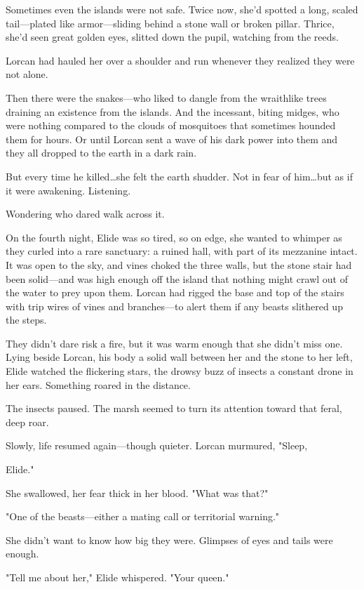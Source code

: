 Sometimes even the islands were not safe.
Twice now, she'd spotted a long, scaled tail---plated like armor---sliding behind a stone wall or broken pillar.
Thrice, she'd seen great golden eyes, slitted down the pupil, watching from the reeds.

Lorcan had hauled her over a shoulder and run whenever they realized they were not alone.

Then there were the snakes---who liked to dangle from the wraithlike trees draining an existence from the islands.
And the incessant, biting midges, who were nothing compared to the clouds of mosquitoes that sometimes hounded them for hours.
Or until Lorcan sent a wave of his dark power into them and they all dropped to the earth in a dark rain.

But every time he killed\ldots she felt the earth shudder.
Not in fear of him\ldots but as if it were awakening.
Listening.

Wondering who dared walk across it.

On the fourth night, Elide was so tired, so on edge, she wanted to whimper as they curled into a rare sanctuary: a ruined hall, with part of its mezzanine intact.
It was open to the sky, and vines choked the three walls, but the stone stair had been solid---and was high enough off the island that nothing might crawl out of the water to prey upon them.
Lorcan had rigged the base and top of the stairs with trip wires of vines and branches---to alert them if any beasts slithered up the steps.

They didn't dare risk a fire, but it was warm enough that she didn't miss one.
Lying beside Lorcan, his body a solid wall between her and the stone to her left, Elide watched the flickering stars, the drowsy buzz of insects a constant drone in her ears.
Something roared in the distance.

The insects paused.
The marsh seemed to turn its attention toward that feral, deep roar.

Slowly, life resumed again---though quieter.
Lorcan murmured, "Sleep,

Elide."

She swallowed, her fear thick in her blood.
"What was that?"

"One of the beasts---either a mating call or territorial warning."

She didn't want to know how big they were.
Glimpses of eyes and tails were enough.

"Tell me about her," Elide whispered.
"Your queen."

